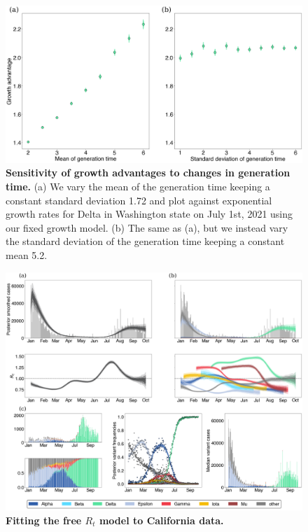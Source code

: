 \documentclass[11pt,oneside,letterpaper]{article}
\begin{document}
\begin{figure}
  \centering
  \includegraphics[width=\linewidth]{figs/growth_advantage_sensitivity.png}
  \caption{\textbf{Sensitivity of growth advantages to changes in generation time.} 
(a) We vary the mean of the generation time keeping a constant standard deviation 1.72 and plot against exponential growth rates for Delta in Washington state on July 1st, 2021 using our fixed growth model.
(b) The same as (a), but we instead vary the standard deviation of the generation time keeping a constant mean 5.2.}%
  \label{fig:growth_advantage_sensitivity}
\end{figure}


\begin{figure}
  \centering
  \includegraphics[width=\linewidth]{figs/free_rt_California.png}
  \caption{\textbf{Fitting the free $R_{t}$ model to California data.}}%
  \label{fig:free_rt_California}
\end{figure}
\end{document}
